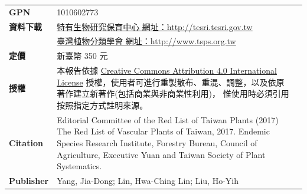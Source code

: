 \begin{table}[H]
{\begin{tabular}{>{\raggedleft\arraybackslash}p{2.5cm}p{9cm}p{3cm}}
      \textbf{GPN}               & 1010602773  & \\
      \textbf{資料下載}          & \href{http://tesri.tesri.gov.tw}{特有生物研究保育中心 網址：http://tesri.tesri.gov.tw}  & \\
                                 & \href{http://www.tsps.org.tw}{臺灣植物分類學會 網址：http://www.tsps.org.tw}  & \\
      \textbf{定價}              & 新臺幣 350 元  & \\
      \textbf{授權}              & 本報告依據
                                   \href{https://creativecommons.org/licenses/by/4.0}{Creative Commons Attribution 4.0 International License}
                                   授權，使用者可進行重製散布、重混、調整，以及依原著作建立新著作(包括商業與非商業性利用)，
                                   惟使用時必須引用按照指定方式註明來源。  & \\
      \textbf{Citation}          & Editorial Committee of the Red List of Taiwan Plants (2017) The Red List of Vascular Plants of Taiwan, 2017.
                                   Endemic Species Research Institute, Forestry Bureau, Council of Agriculture, 
                                   Executive Yuan and Taiwan Society of Plant Systematics.  & \\
      \textbf{Publisher}         & Yang, Jia-Dong; Lin, Hwa-Ching Lin; Liu, Ho-Yih  & 
\end{tabular}}
\end{table}
